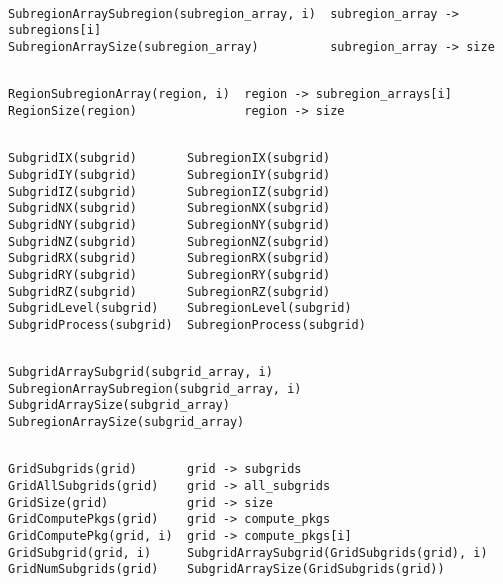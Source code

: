 \begin{display}\begin{verbatim}

SubregionArraySubregion(subregion_array, i)  subregion_array -> subregions[i]
SubregionArraySize(subregion_array)          subregion_array -> size

\end{verbatim}\end{display}

\begin{display}\begin{verbatim}

RegionSubregionArray(region, i)  region -> subregion_arrays[i]
RegionSize(region)               region -> size

\end{verbatim}\end{display}

\begin{display}\begin{verbatim}

SubgridIX(subgrid)       SubregionIX(subgrid)
SubgridIY(subgrid)       SubregionIY(subgrid)
SubgridIZ(subgrid)       SubregionIZ(subgrid)
SubgridNX(subgrid)       SubregionNX(subgrid)
SubgridNY(subgrid)       SubregionNY(subgrid)
SubgridNZ(subgrid)       SubregionNZ(subgrid)
SubgridRX(subgrid)       SubregionRX(subgrid)
SubgridRY(subgrid)       SubregionRY(subgrid)
SubgridRZ(subgrid)       SubregionRZ(subgrid)
SubgridLevel(subgrid)    SubregionLevel(subgrid)
SubgridProcess(subgrid)  SubregionProcess(subgrid)

\end{verbatim}\end{display}

\begin{display}\begin{verbatim}

SubgridArraySubgrid(subgrid_array, i)  SubregionArraySubregion(subgrid_array, i)
SubgridArraySize(subgrid_array)        SubregionArraySize(subgrid_array)

\end{verbatim}\end{display}

\begin{display}\begin{verbatim}

GridSubgrids(grid)       grid -> subgrids
GridAllSubgrids(grid)    grid -> all_subgrids
GridSize(grid)           grid -> size
GridComputePkgs(grid)    grid -> compute_pkgs
GridComputePkg(grid, i)  grid -> compute_pkgs[i]
GridSubgrid(grid, i)     SubgridArraySubgrid(GridSubgrids(grid), i)
GridNumSubgrids(grid)    SubgridArraySize(GridSubgrids(grid))

\end{verbatim}\end{display}

